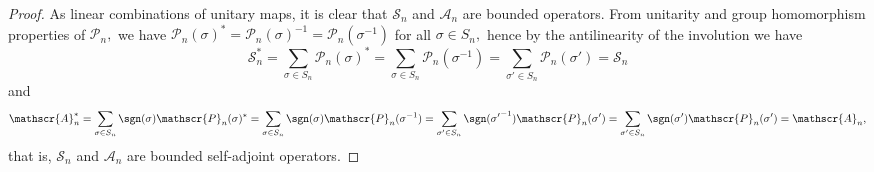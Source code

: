 \begin{proof}
    As linear combinations of unitary maps, it is clear that \(\mathscr{S}_n\) and \(\mathscr{A}_n\) are bounded operators. From unitarity and group homomorphism properties of \(\mathscr{P}_n,\) we have \(\mathscr{P}_n(\sigma)^* = \mathscr{P}_n(\sigma)^{-1} = \mathscr{P}_n(\sigma^{-1})\) for all \(\sigma \in S_n,\) hence by the antilinearity of the involution we have
    \begin{equation*}
        \mathscr{S}_n^* = \sum_{\sigma \in S_n}{\mathscr{P}_n(\sigma)^*} = \sum_{\sigma \in S_n}{\mathscr{P}_n(\sigma^{-1})} = \sum_{\sigma' \in S_n}{\mathscr{P}_n(\sigma')} = \mathscr{S}_n
    \end{equation*}
    and
    \begin{equation*}
        \mathscr{A}_n^* = \sum_{\sigma \in S_n}{\sgn(\sigma)\mathscr{P}_n(\sigma)^*} = \sum_{\sigma \in S_n}{\sgn(\sigma)\mathscr{P}_n(\sigma^{-1})} = \sum_{\sigma' \in S_n}{\sgn({\sigma'}^{-1})\mathscr{P}_n(\sigma')} = \sum_{\sigma' \in S_n}{\sgn(\sigma')\mathscr{P}_n(\sigma')}  = \mathscr{A}_n,
    \end{equation*}
    that is, \(\mathscr{S}_n\) and \(\mathscr{A}_n\) are bounded self-adjoint operators.
\end{proof}

